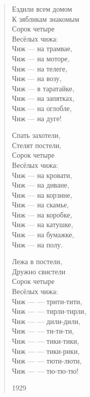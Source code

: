\begin{verse}
Ездили всем домом \\
К зябликам знакомым \\
Сорок четыре \\
Весёлых чижа: \\
Чиж --- на трамвае, \\
Чиж --- на моторе, \\
Чиж --- на телеге, \\
Чиж --- на возу, \\
Чиж --- в таратайке, \\
Чиж --- на запятках, \\
Чиж --- на оглобле, \\
Чиж --- на дуге!

Спать захотели, \\
Стелят постели, \\
Сорок четыре \\
Весёлых чижа: \\
Чиж --- на кровати, \\
Чиж --- на диване, \\
Чиж --- на корзине, \\
Чиж --- на скамье, \\
Чиж --- на коробке, \\
Чиж --- на катушке, \\
Чиж --- на бумажке, \\
Чиж --- на полу.

Лежа в постели, \\
Дружно свистели \\
Сорок четыре \\
Весёлых чижа: \\
Чиж --- --- трити-тити, \\
Чиж --- --- тирли-тирли, \\
Чиж --- --- дили-дили, \\
Чиж --- --- ти-ти-ти, \\
Чиж --- --- тики-тики, \\
Чиж --- --- тики-рики, \\
Чиж --- --- тюти-люти, \\
Чиж --- --- тю-тю-тю!

1929
\end{verse}